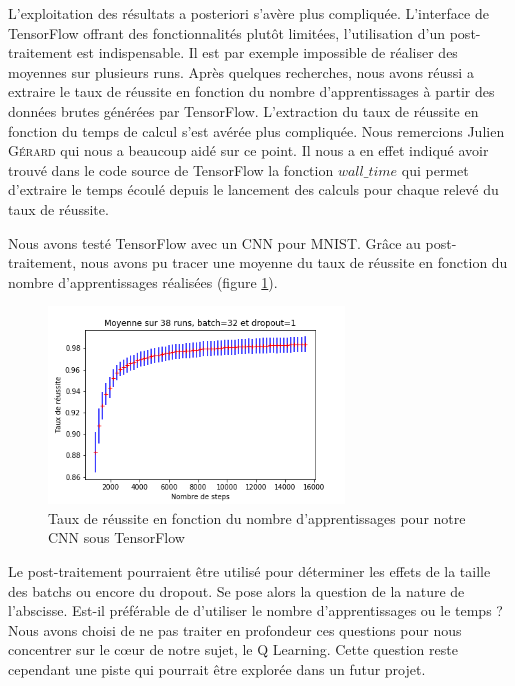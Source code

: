 L'exploitation des résultats a posteriori s'avère plus compliquée. L'interface de TensorFlow offrant des fonctionnalités plutôt limitées, l'utilisation d'un post-traitement est indispensable. Il est par exemple impossible de réaliser des moyennes sur plusieurs runs. Après quelques recherches, nous avons réussi a extraire le taux de réussite en fonction du nombre d'apprentissages à partir des données brutes générées par TensorFlow. L'extraction du taux de réussite en fonction du temps de calcul s'est avérée plus compliquée. Nous remercions Julien \textsc{Gérard} qui nous a beaucoup aidé sur ce point. Il nous a en effet indiqué avoir trouvé dans le code source de TensorFlow la fonction $wall\_time$ qui permet d'extraire le temps écoulé depuis le lancement des calculs pour chaque relevé du taux de réussite.

Nous avons testé TensorFlow avec un CNN pour MNIST. Grâce au post-traitement, nous avons pu tracer une moyenne du taux de réussite en fonction du nombre d'apprentissages réalisées (figure \ref{fig:tb_post_traitement}).

\begin{figure}[h]
 \centering
 \includegraphics[width=0.7\textwidth]{img/tb_post_traitement.png}
 \caption{Taux de réussite en fonction du nombre d'apprentissages pour notre CNN sous TensorFlow}
 \label{fig:tb_post_traitement}
\end{figure}

Le post-traitement pourraient être utilisé pour déterminer les effets de la taille des batchs ou encore du dropout. Se pose alors la question de la nature de l’abscisse. Est-il préférable de d'utiliser le nombre d'apprentissages ou le temps ?
Nous avons choisi de ne pas traiter en profondeur ces questions pour nous concentrer sur le c\oe ur de notre sujet, le Q Learning. Cette question reste cependant une piste qui pourrait être explorée dans un futur projet.
